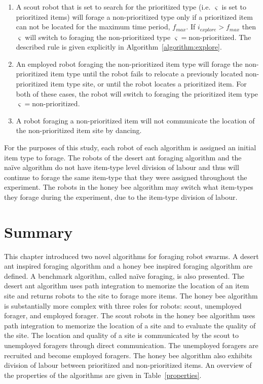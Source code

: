 \begin{enumerate}
\item A scout robot that is set to search for the prioritized type (i.e. $\varsigma$ is set to prioritized items) will forage a non-prioritized type only if a prioritized item can not be located for the maximum time period, $f_{max}$. If $i_{explore} > f_{max}$ then $\varsigma$ will switch to foraging the non-prioritized type $\varsigma=\text{non-prioritized}$. The described rule is given explicitly in Algorithm~\ref{algorithm:explore}.
\item An employed robot foraging the non-prioritized item type will forage the non-prioritized item type until the robot fails to relocate a previously located non-prioritized item type site, or until the robot locates a prioritized item. For both of these cases, the robot will switch to foraging the prioritized item type $\varsigma=\text{non-prioritized}$.
\item A robot foraging a non-prioritized item will not communicate the location of the non-prioritized item site by dancing. 
\end{enumerate}

For the purposes of this study, each robot of each algorithm is assigned an initial item type to forage. The robots of the desert ant foraging algorithm and the na\"ive algorithm do not have item-type level division of labour and thus will continue to forage the same item-type that they were assigned throughout the experiment. The robots in the honey bee algorithm may switch what item-types they forage during the experiment, due to the item-type division of labour. 

\section{Summary}
\label{prioritized:summary}

This chapter introduced two novel algorithms for foraging robot swarms. A desert ant inspired foraging algorithm and a honey bee inspired foraging algorithm are defined. A benchmark algorithm, called na\"ive foraging, is also presented. The desert ant algorithm uses path integration to memorize the location of an item site and returns robots to the site to forage more items. The honey bee algorithm is substantially more complex with three roles for robots: scout, unemployed forager, and employed forager. The scout robots in the honey bee algorithm uses path integration to memorize the location of a site and to evaluate the quality of the site. The location and quality of a site is communicated by the scout to unemployed foragers through direct communication. The unemployed foragers are recruited and become employed foragers. The honey bee algorithm also exhibits division of labour between prioritized and non-prioritized items. An overview of the properties of the algorithms are given in Table~\ref{properties}.

